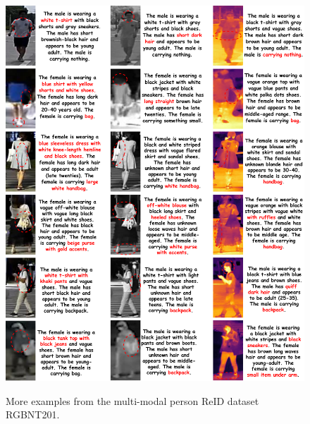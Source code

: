 \begin{figure}[t]
  \centering
    \resizebox{0.92\textwidth}{!}
    {
  \includegraphics[width=1.\linewidth]{sec/supp_img/More_Instance_Person.pdf}
  }
  \vspace{-2mm}
   \caption{More examples from the multi-modal person ReID dataset RGBNT201.}
  \label{fig:more_instance_person}
  \vspace{-6mm}
\end{figure}
